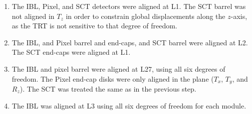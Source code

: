 \begin{enumerate}
\item The IBL, Pixel, and SCT detectors were aligned at L1.  The SCT barrel was not aligned in $T_z$ in order to constrain global displacements along the $z$-axis, as the TRT is not sensitive to that degree of freedom.
\item The IBL, and Pixel barrel and end-caps, and SCT barrel were aligned at L2.  The SCT end-caps were aligned at L1.
\item The IBL and pixel barrel were aligned at L27, using all six degrees of freedom.  The Pixel end-cap disks were only aligned in the plane ($T_x$, $T_y$, and $R_z$).  The SCT was treated the same as in the previous step.
\item The IBL was aligned at L3 using all six degrees of freedom for each module.
\end{enumerate}

